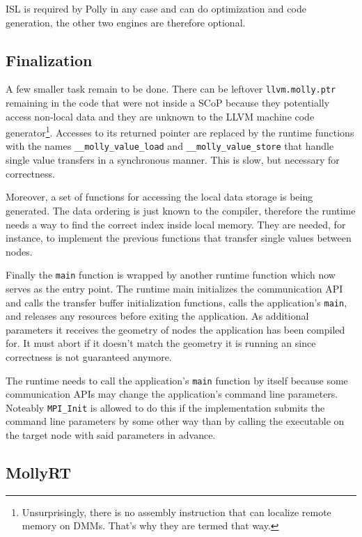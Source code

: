 \documentclass{sigplanconf}
\begin{document}
ISL is required by Polly in any case and can do optimization and code generation, the other two engines are therefore optional.


\subsection{Finalization}

A few smaller task remain to be done. There can be leftover \texttt{llvm.molly.ptr} remaining in the code that were not inside a SCoP because they potentially access non-local data and they are unknown to the LLVM machine code generator\footnote{Unsurprisingly, there is no assembly instruction that can localize remote memory on DMMs. That's why they are termed that way.}. Accesses to its returned pointer are replaced by the runtime functions with the names \texttt{\_\_molly\_value\_load} and \texttt{\_\_molly\_value\_store} that handle single value transfers in a synchronous manner. This is slow, but necessary for correctness.

Moreover, a set of functions for accessing the local data storage is being generated. The data ordering is just known to the compiler, therefore the runtime needs a way to find the correct index inside local memory. They are needed, for instance, to implement the previous functions that transfer single values between nodes.

Finally the \texttt{main} function is wrapped by another runtime function which now serves as the entry point. The runtime main initializes the communication API and calls the transfer buffer initialization functions, calls the application's \texttt{main}, and releases any resources before exiting the application. As additional parameters it receives the geometry of nodes the application has been compiled for. It must abort if it doesn't match the geometry it is running an since correctness is not guaranteed anymore.

The runtime needs to call the application's \texttt{main} function by itself because some communication APIs may change the application's command line parameters. Noteably \texttt{MPI\_Init} is allowed to do this if the implementation submits the command line parameters by some other way than by calling the executable on the target node with said parameters in advance.


\subsection{MollyRT}
\end{document}
